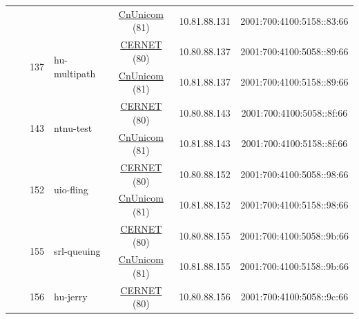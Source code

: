 \begin{small}
\begin{center}
\begin{longtable}{|c|c|c|c|c|c|c|c|}
  &  &  &  & \multicolumn{2}{|c|}{\tiny{\href{http://www.chinaunicom.com}{CnUnicom} (81)}} & \tiny{10.81.88.131} & \tiny{2001:700:4100:5158::83:66} \\* \cline{3-3}\cline{4-4}\cline{5-5}\cline{6-6}\cline{7-7}\cline{8-8}
  &  & \multirow{2}{*}{\tiny{137}} & \multicolumn{1}{|l|}{\multirow{2}{*}{\tiny{hu-multipath}}} & \multicolumn{2}{|c|}{\tiny{\href{http://www.cernet.edu.cn}{CERNET} (80)}} & \tiny{10.80.88.137} & \tiny{2001:700:4100:5058::89:66} \\* \cline{5-5}\cline{6-6}\cline{7-7}\cline{8-8}
  &  &  &  & \multicolumn{2}{|c|}{\tiny{\href{http://www.chinaunicom.com}{CnUnicom} (81)}} & \tiny{10.81.88.137} & \tiny{2001:700:4100:5158::89:66} \\* \cline{3-3}\cline{4-4}\cline{5-5}\cline{6-6}\cline{7-7}\cline{8-8}
  &  & \multirow{2}{*}{\tiny{143}} & \multicolumn{1}{|l|}{\multirow{2}{*}{\tiny{ntnu-test}}} & \multicolumn{2}{|c|}{\tiny{\href{http://www.cernet.edu.cn}{CERNET} (80)}} & \tiny{10.80.88.143} & \tiny{2001:700:4100:5058::8f:66} \\* \cline{5-5}\cline{6-6}\cline{7-7}\cline{8-8}
  &  &  &  & \multicolumn{2}{|c|}{\tiny{\href{http://www.chinaunicom.com}{CnUnicom} (81)}} & \tiny{10.81.88.143} & \tiny{2001:700:4100:5158::8f:66} \\* \cline{3-3}\cline{4-4}\cline{5-5}\cline{6-6}\cline{7-7}\cline{8-8}
  &  & \multirow{2}{*}{\tiny{152}} & \multicolumn{1}{|l|}{\multirow{2}{*}{\tiny{uio-fling}}} & \multicolumn{2}{|c|}{\tiny{\href{http://www.cernet.edu.cn}{CERNET} (80)}} & \tiny{10.80.88.152} & \tiny{2001:700:4100:5058::98:66} \\* \cline{5-5}\cline{6-6}\cline{7-7}\cline{8-8}
  &  &  &  & \multicolumn{2}{|c|}{\tiny{\href{http://www.chinaunicom.com}{CnUnicom} (81)}} & \tiny{10.81.88.152} & \tiny{2001:700:4100:5158::98:66} \\* \cline{3-3}\cline{4-4}\cline{5-5}\cline{6-6}\cline{7-7}\cline{8-8}
  &  & \multirow{2}{*}{\tiny{155}} & \multicolumn{1}{|l|}{\multirow{2}{*}{\tiny{srl-queuing}}} & \multicolumn{2}{|c|}{\tiny{\href{http://www.cernet.edu.cn}{CERNET} (80)}} & \tiny{10.80.88.155} & \tiny{2001:700:4100:5058::9b:66} \\* \cline{5-5}\cline{6-6}\cline{7-7}\cline{8-8}
  &  &  &  & \multicolumn{2}{|c|}{\tiny{\href{http://www.chinaunicom.com}{CnUnicom} (81)}} & \tiny{10.81.88.155} & \tiny{2001:700:4100:5158::9b:66} \\* \cline{3-3}\cline{4-4}\cline{5-5}\cline{6-6}\cline{7-7}\cline{8-8}
  &  & \multirow{2}{*}{\tiny{156}} & \multicolumn{1}{|l|}{\multirow{2}{*}{\tiny{hu-jerry}}} & \multicolumn{2}{|c|}{\tiny{\href{http://www.cernet.edu.cn}{CERNET} (80)}} & \tiny{10.80.88.156} & \tiny{2001:700:4100:5058::9c:66} \\* \cline{5-5}\cline{6-6}\cline{7-7}\cline{8-8}

\end{longtable}
\end{center}
\end{small}
